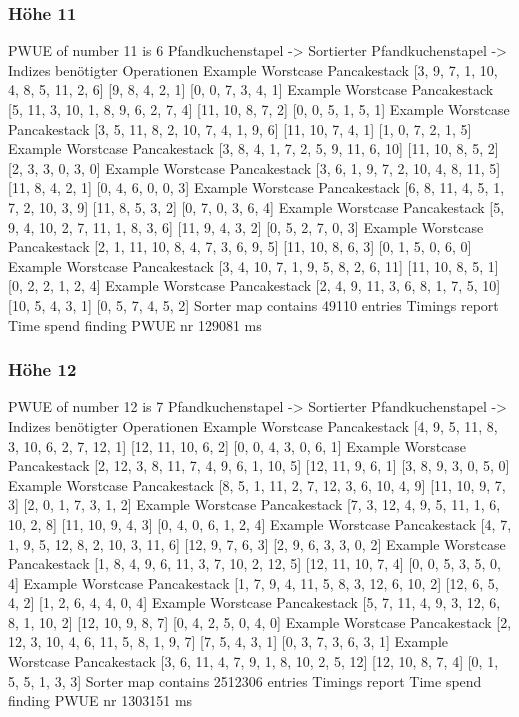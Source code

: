 {    \subsubsection{Höhe 11}

    PWUE of number 11 is 6
    Pfandkuchenstapel -> Sortierter Pfandkuchenstapel -> Indizes benötigter Operationen
Example Worstcase Pancakestack
    [3, 9, 7, 1, 10, 4, 8, 5, 11, 2, 6]
    [9, 8, 4, 2, 1]
    [0, 0, 7, 3, 4, 1]
    Example Worstcase Pancakestack
    [5, 11, 3, 10, 1, 8, 9, 6, 2, 7, 4]
    [11, 10, 8, 7, 2]
    [0, 0, 5, 1, 5, 1]
    Example Worstcase Pancakestack
    [3, 5, 11, 8, 2, 10, 7, 4, 1, 9, 6]
    [11, 10, 7, 4, 1]
    [1, 0, 7, 2, 1, 5]
    Example Worstcase Pancakestack
    [3, 8, 4, 1, 7, 2, 5, 9, 11, 6, 10]
    [11, 10, 8, 5, 2]
    [2, 3, 3, 0, 3, 0]
    Example Worstcase Pancakestack
    [3, 6, 1, 9, 7, 2, 10, 4, 8, 11, 5]
    [11, 8, 4, 2, 1]
    [0, 4, 6, 0, 0, 3]
    Example Worstcase Pancakestack
    [6, 8, 11, 4, 5, 1, 7, 2, 10, 3, 9]
    [11, 8, 5, 3, 2]
    [0, 7, 0, 3, 6, 4]
    Example Worstcase Pancakestack
    [5, 9, 4, 10, 2, 7, 11, 1, 8, 3, 6]
    [11, 9, 4, 3, 2]
    [0, 5, 2, 7, 0, 3]
    Example Worstcase Pancakestack
    [2, 1, 11, 10, 8, 4, 7, 3, 6, 9, 5]
    [11, 10, 8, 6, 3]
    [0, 1, 5, 0, 6, 0]
    Example Worstcase Pancakestack
    [3, 4, 10, 7, 1, 9, 5, 8, 2, 6, 11]
    [11, 10, 8, 5, 1]
    [0, 2, 2, 1, 2, 4]
    Example Worstcase Pancakestack
    [2, 4, 9, 11, 3, 6, 8, 1, 7, 5, 10]
    [10, 5, 4, 3, 1]
    [0, 5, 7, 4, 5, 2]
    Sorter map contains 49110 entries
    Timings report
    Time spend finding PWUE nr 129081 ms
    \subsubsection{Höhe 12}

    PWUE of number 12 is 7
    Pfandkuchenstapel -> Sortierter Pfandkuchenstapel -> Indizes benötigter Operationen
Example Worstcase Pancakestack
    [4, 9, 5, 11, 8, 3, 10, 6, 2, 7, 12, 1]
    [12, 11, 10, 6, 2]
    [0, 0, 4, 3, 0, 6, 1]
    Example Worstcase Pancakestack
    [2, 12, 3, 8, 11, 7, 4, 9, 6, 1, 10, 5]
    [12, 11, 9, 6, 1]
    [3, 8, 9, 3, 0, 5, 0]
    Example Worstcase Pancakestack
    [8, 5, 1, 11, 2, 7, 12, 3, 6, 10, 4, 9]
    [11, 10, 9, 7, 3]
    [2, 0, 1, 7, 3, 1, 2]
    Example Worstcase Pancakestack
    [7, 3, 12, 4, 9, 5, 11, 1, 6, 10, 2, 8]
    [11, 10, 9, 4, 3]
    [0, 4, 0, 6, 1, 2, 4]
    Example Worstcase Pancakestack
    [4, 7, 1, 9, 5, 12, 8, 2, 10, 3, 11, 6]
    [12, 9, 7, 6, 3]
    [2, 9, 6, 3, 3, 0, 2]
    Example Worstcase Pancakestack
    [1, 8, 4, 9, 6, 11, 3, 7, 10, 2, 12, 5]
    [12, 11, 10, 7, 4]
    [0, 0, 5, 3, 5, 0, 4]
    Example Worstcase Pancakestack
    [1, 7, 9, 4, 11, 5, 8, 3, 12, 6, 10, 2]
    [12, 6, 5, 4, 2]
    [1, 2, 6, 4, 4, 0, 4]
    Example Worstcase Pancakestack
    [5, 7, 11, 4, 9, 3, 12, 6, 8, 1, 10, 2]
    [12, 10, 9, 8, 7]
    [0, 4, 2, 5, 0, 4, 0]
    Example Worstcase Pancakestack
    [2, 12, 3, 10, 4, 6, 11, 5, 8, 1, 9, 7]
    [7, 5, 4, 3, 1]
    [0, 3, 7, 3, 6, 3, 1]
    Example Worstcase Pancakestack
    [3, 6, 11, 4, 7, 9, 1, 8, 10, 2, 5, 12]
    [12, 10, 8, 7, 4]
    [0, 1, 5, 5, 1, 3, 3]
    Sorter map contains 2512306 entries
    Timings report
    Time spend finding PWUE nr 1303151 ms
}

